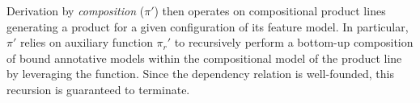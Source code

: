 Derivation by \textit{composition} ($\pi'$) then operates on compositional product lines generating a product for a given configuration of its feature model. In particular, $\pi'$ relies on auxiliary function $\pi_r'$ to recursively 
perform a bottom-up composition of bound annotative models within the compositional model of the product line by leveraging the  function.
Since the dependency relation is well-founded, this recursion is guaranteed to terminate.

